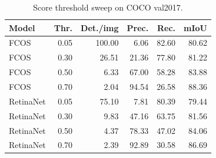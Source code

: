 \begin{table}[t]
\centering
\caption{Score threshold sweep on COCO val2017.}
\label{tab:threshold-sweep}
\begin{tabular}{lrrrrr}
\toprule
Model & Thr. & Det./img & Prec. & Rec. & mIoU \\
\midrule
FCOS & 0.05 & 100.00 & 6.06 & 82.60 & 80.62 \\
FCOS & 0.30 & 26.51 & 21.36 & 77.80 & 81.22 \\
FCOS & 0.50 & 6.33 & 67.00 & 58.28 & 83.88 \\
FCOS & 0.70 & 2.04 & 94.54 & 26.58 & 88.36 \\
RetinaNet & 0.05 & 75.10 & 7.81 & 80.39 & 79.44 \\
RetinaNet & 0.30 & 9.83 & 47.16 & 63.75 & 81.56 \\
RetinaNet & 0.50 & 4.37 & 78.33 & 47.02 & 84.06 \\
RetinaNet & 0.70 & 2.39 & 92.89 & 30.58 & 86.69 \\
\bottomrule
\end{tabular}
\end{table}
